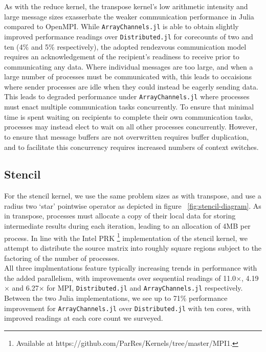As with the reduce kernel, the transpose kernel's low arithmetic
intensity and large message sizes exasserbate the weaker communication
performance in Julia compared to OpenMPI. While
\texttt{ArrayChannels.jl} is able to obtain slightly improved
performance readings over \texttt{Distributed.jl} for corecounts of two
and ten (4\% and 5\% respectively), the adopted rendezvous communication
model requires an acknowledgement of the recipient's readiness to
receive prior to communicating any data. Where individual messages are
too large, and when a large number of processes must be communicated
with, this leads to occaisions where sender processes are idle when they
could instead be eagerly sending data. This leads to degraded
performance under \texttt{ArrayChannels.jl} where processes must enact
multiple communication tasks concurrently. To ensure that minimal time
is spent waiting on recipients to complete their own communication
tasks, processes may instead elect to wait on all other processes
concurrently. However, to ensure that message buffers are not
overwritten requires buffer duplication, and to facilitate this
concurrency requires increased numbers of context switches.

\subsection{Stencil}
\label{sec:stencil}

For the stencil kernel, we use the same problem sizes as with transpose,
and use a radius two `star' pointwise operator as depicted in figure
~\ref{fig:stencil-diagram}. As in transpose, processes must allocate a
copy of their local data for storing intermediate results during each
iteration, leading to an allocation of 4MB per process. In line with the
Intel PRK \footnote{Available at
  https://github.com/ParRes/Kernels/tree/master/MPI1.} implementation of
the stencil kernel, we attempt to distribute the source matrix into
roughly square regions subject to the factoring of the number of
processes.\\

All three implmentations feature typically increasing trends in
performance with the added parallelism, with improvements over
sequential readings of 11.0\(\times\), 4.19\(\times\) and 6.27\(\times\)
for MPI, \texttt{Distributed.jl} and \texttt{ArrayChannels.jl}
respectively. Between the two Julia implementations, we see up to 71\%
performance improvement for \texttt{ArrayChannels.jl} over
\texttt{Distributed.jl} with ten cores, with improved readings at each
core count we surveyed.\\

